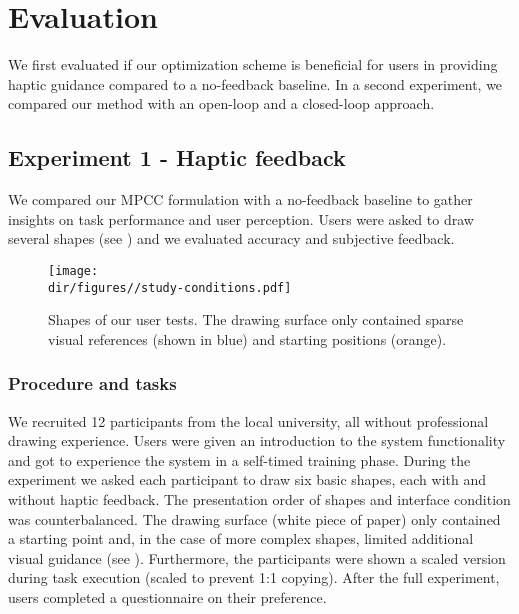 \section{Evaluation}
We first evaluated if our optimization scheme is beneficial for users in providing haptic guidance compared to a no-feedback baseline.
In a second experiment, we compared our method with an open-loop and a closed-loop approach.

\subsection{Experiment 1 - Haptic feedback}
We compared our MPCC formulation with a no-feedback baseline to gather insights on task performance and user perception.
Users were asked to draw several shapes (see ) and we evaluated accuracy and subjective feedback. 

\begin{figure}[!t]
    \centering
    \texttt{[image: \\dir/figures//study-conditions.pdf]}   
     \caption{Shapes of our user tests. 
    The drawing surface only contained sparse visual references (shown in blue) and starting positions (orange).}
    \label{fig:usertest_examples}
    \vspace{-1em}
\end{figure}

\subsubsection{Procedure and tasks}
We recruited 12 participants from the local university, all without professional drawing experience. 
Users were given an introduction to the system functionality and got to experience the system in a self-timed training phase.
During the experiment we asked each participant to draw six basic shapes, each with and without haptic feedback.
The presentation order of shapes and interface condition was counterbalanced. 
The drawing surface (white piece of paper) only contained a starting point and, in the case of more complex shapes, limited additional visual guidance (see ).
Furthermore, the participants were shown a scaled version during task execution (scaled to prevent 1:1 copying). 
After the full experiment, users completed a questionnaire on their preference.

